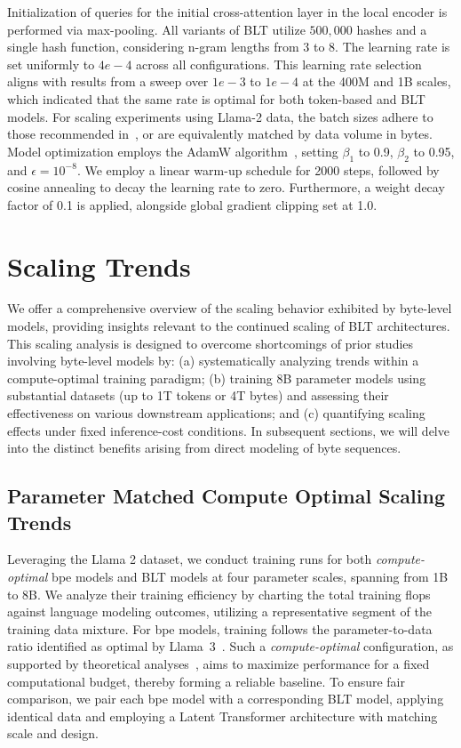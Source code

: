 Initialization of queries for the initial cross-attention layer in the local encoder is performed via max-pooling. All variants of {\textsc BLT} utilize $500,000$ hashes and a single hash function, considering n-gram lengths from 3 to 8. The learning rate is set uniformly to $4e-4$ across all configurations. This learning rate selection aligns with results from a sweep over $1e-3$ to $1e-4$ at the 400M and 1B scales, which indicated that the same rate is optimal for both token-based and {\textsc BLT} models. For scaling experiments using Llama-2 data, the batch sizes adhere to those recommended in~\cite{dubey2024llama}, or are equivalently matched by data volume in bytes. Model optimization employs the AdamW algorithm~\citep{adamw}, setting $\beta_1$ to 0.9, $\beta_2$ to 0.95, and $\epsilon=10^{-8}$. We employ a linear warm-up schedule for 2000 steps, followed by cosine annealing to decay the learning rate to zero. Furthermore, a weight decay factor of 0.1 is applied, alongside global gradient clipping set at 1.0.

\section{Scaling Trends}
\label{section:scaling}

We offer a comprehensive overview of the scaling behavior exhibited by byte-level models, providing insights relevant to the continued scaling of {\textsc BLT} architectures. This scaling analysis is designed to overcome shortcomings of prior studies involving byte-level models by: (a) systematically analyzing trends within a compute-optimal training paradigm; (b) training 8B parameter models using substantial datasets (up to 1T tokens or 4T bytes) and assessing their effectiveness on various downstream applications; and (c) quantifying scaling effects under fixed inference-cost conditions. In subsequent sections, we will delve into the distinct benefits arising from direct modeling of byte sequences.

\subsection{Parameter Matched Compute Optimal Scaling Trends}
\label{section:parameter-matched-scaling}
Leveraging the Llama 2 dataset, we conduct training runs for both \textit{compute-optimal} bpe models and {\textsc BLT} models at four parameter scales, spanning from 1B to 8B. We analyze their training efficiency by charting the total training flops against language modeling outcomes, utilizing a representative segment of the training data mixture. For bpe models, training follows the parameter-to-data ratio identified as optimal by Llama~3~\citep{dubey2024llama}. Such a \textit{compute-optimal} configuration, as supported by theoretical analyses~\citep{hoffmann2022training}, aims to maximize performance for a fixed computational budget, thereby forming a reliable baseline. To ensure fair comparison, we pair each bpe model with a corresponding {\textsc BLT} model, applying identical data and employing a Latent Transformer architecture with matching scale and design.

